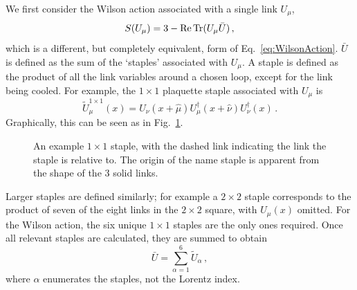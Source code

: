 We first consider the Wilson action associated with a single link $U_\mu$, 
\begin{equation}
S(U_\mu) = 3 - \operatorname{Re}\operatorname{Tr} (U_\mu \bar{U})\, ,
\label{eq:WilsonActionCool}
\end{equation}
which is a different, but completely equivalent, form of Eq.~\ref{eq:WilsonAction}. $\bar{U}$ is defined as the sum of the `staples' associated with $U_\mu$.  A staple is defined as the product of all the link variables around a chosen loop, except for the link being cooled. For example, the $1\times 1$ plaquette staple associated with $U_\mu$ is
%
\begin{equation}
\tilde { U }^{1\times 1} _ { \mu }(x) = U _ { \nu } ( x + \hat { \mu } ) U _ { \mu } ^ { \dagger } ( x + \hat { \nu } ) U _ { \nu } ^ { \dagger } ( x )\, .
\end{equation}
%
Graphically, this can be seen as in Fig.~\ref{fig:Staple}.
\begin{figure}[h!]
\centering

\caption{\label{fig:Staple} An example $1\times 1$ staple, with the dashed link indicating the link the staple is relative to. The origin of the name staple is apparent from the shape of the 3 solid links.}
\end{figure}
Larger staples are defined similarly; for example a $2\times 2$ staple corresponds to the product of seven of the eight links in the $2\times 2$ square, with $U_\mu(x)$ omitted. For the Wilson action, the six unique $1\times 1$ staples are the only ones required. Once all relevant staples are calculated, they are summed to obtain
%
\begin{equation}
\bar{U} = \sum_{\alpha = 1} ^ 6 \tilde{U}_\alpha\, ,
\label{eq:Staples}
\end{equation}
where $\alpha$ enumerates the staples, not the Lorentz index.\\
%

